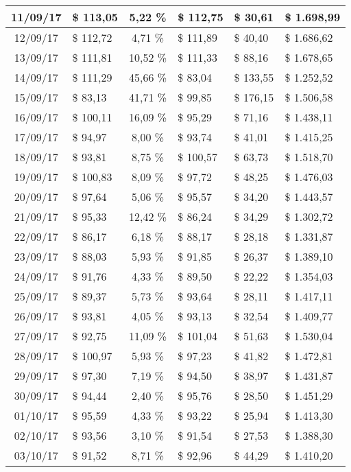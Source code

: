 \begin{center}
\begin{small}
\begin{longtable}{|c|l|c|l|l|l|}
11/09/17 & \$ 113,05 & 5,22 \% & \$ 112,75 & \$ 30,61 & \$ 1.698,99 \\ \hline
12/09/17 & \$ 112,72 & 4,71 \% & \$ 111,89 & \$ 40,40 & \$ 1.686,62 \\ \hline
13/09/17 & \$ 111,81 & 10,52 \% & \$ 111,33 & \$ 88,16 & \$ 1.678,65 \\ \hline
14/09/17 & \$ 111,29 & 45,66 \% & \$ 83,04 & \$ 133,55 & \$ 1.252,52 \\ \hline
15/09/17 & \$ 83,13 & 41,71 \% & \$ 99,85 & \$ 176,15 & \$ 1.506,58 \\ \hline
16/09/17 & \$ 100,11 & 16,09 \% & \$ 95,29 & \$ 71,16 & \$ 1.438,11 \\ \hline
17/09/17 & \$ 94,97 & 8,00 \% & \$ 93,74 & \$ 41,01 & \$ 1.415,25 \\ \hline
18/09/17 & \$ 93,81 & 8,75 \% & \$ 100,57 & \$ 63,73 & \$ 1.518,70 \\ \hline
19/09/17 & \$ 100,83 & 8,09 \% & \$ 97,72 & \$ 48,25 & \$ 1.476,03 \\ \hline
20/09/17 & \$ 97,64 & 5,06 \% & \$ 95,57 & \$ 34,20 & \$ 1.443,57 \\ \hline
21/09/17 & \$ 95,33 & 12,42 \% & \$ 86,24 & \$ 34,29 & \$ 1.302,72 \\ \hline
22/09/17 & \$ 86,17 & 6,18 \% & \$ 88,17 & \$ 28,18 & \$ 1.331,87 \\ \hline
23/09/17 & \$ 88,03 & 5,93 \% & \$ 91,85 & \$ 26,37 & \$ 1.389,10 \\ \hline
24/09/17 & \$ 91,76 & 4,33 \% & \$ 89,50 & \$ 22,22 & \$ 1.354,03 \\ \hline
25/09/17 & \$ 89,37 & 5,73 \% & \$ 93,64 & \$ 28,11 & \$ 1.417,11 \\ \hline
26/09/17 & \$ 93,81 & 4,05 \% & \$ 93,13 & \$ 32,54 & \$ 1.409,77 \\ \hline
27/09/17 & \$ 92,75 & 11,09 \% & \$ 101,04 & \$ 51,63 & \$ 1.530,04 \\ \hline
28/09/17 & \$ 100,97 & 5,93 \% & \$ 97,23 & \$ 41,82 & \$ 1.472,81 \\ \hline
29/09/17 & \$ 97,30 & 7,19 \% & \$ 94,50 & \$ 38,97 & \$ 1.431,87 \\ \hline
30/09/17 & \$ 94,44 & 2,40 \% & \$ 95,76 & \$ 28,50 & \$ 1.451,29 \\ \hline
01/10/17 & \$ 95,59 & 4,33 \% & \$ 93,22 & \$ 25,94 & \$ 1.413,30 \\ \hline
02/10/17 & \$ 93,56 & 3,10 \% & \$ 91,54 & \$ 27,53 & \$ 1.388,30 \\ \hline
03/10/17 & \$ 91,52 & 8,71 \% & \$ 92,96 & \$ 44,29 & \$ 1.410,20 \\ \hline

\end{longtable}
\end{small}
\end{center}
